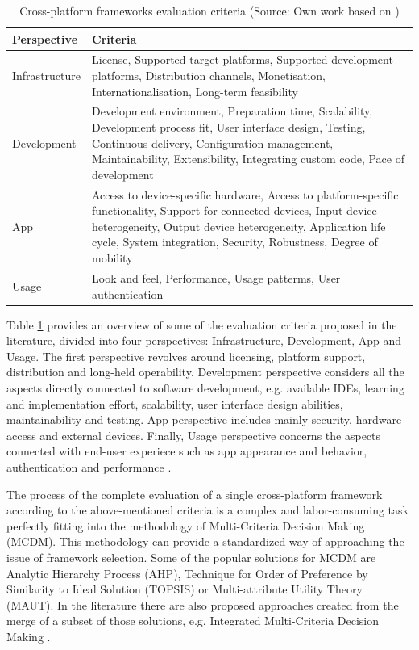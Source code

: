 \begin{table}[h]
	\centering
	\caption{Cross-platform frameworks evaluation criteria (Source: Own work based on \cite{rieger_eval_cp})}
	\label{tab:eval_criteria}
	\begin{tabular}{ |l|p{}| }
		\hline
		\textbf{Perspective}&\textbf{Criteria}\\
		\hline
		Infrastructure&License, Supported target platforms, Supported development platforms, Distribution channels, Monetisation, Internationalisation, Long-term feasibility\\
		\hline
		Development&Development environment, Preparation time, Scalability, Development process fit, User interface design, Testing, Continuous delivery, Configuration management, Maintainability, Extensibility, Integrating custom code, Pace of development\\
		\hline
		App&Access to device-specific hardware, Access to platform-specific functionality, Support for connected devices, Input device heterogeneity, Output device heterogeneity, Application life cycle, System integration, Security, Robustness, Degree of mobility \\
		\hline
		Usage&Look and feel, Performance, Usage patterms, User authentication\\
		\hline
	\end{tabular}
\end{table}

Table \ref{tab:eval_criteria} provides an overview of some of the evaluation criteria proposed in the literature, divided into four perspectives: Infrastructure, Development, App and Usage. The first perspective revolves around licensing, platform support, distribution and long-held operability. Development perspective considers all the aspects directly connected to software development, e.g. available IDEs, learning and implementation effort, scalability, user interface design abilities, maintainability and testing. App perspective includes mainly security, hardware access and external devices. Finally, Usage perspective concerns the aspects connected with end-user experiece such as app appearance and behavior, authentication and performance \cite{eval_rn_flutter,rieger_eval_cp}.

The process of the complete evaluation of a single cross-platform framework according to the above-mentioned criteria is a complex and labor-consuming task perfectly fitting into the methodology of Multi-Criteria Decision Making (MCDM). This methodology can provide a standardized way of approaching the issue of framework selection. Some of the popular solutions for MCDM are Analytic Hierarchy Process (AHP), Technique for Order of Preference by Similarity to Ideal Solution (TOPSIS) or Multi-attribute Utility Theory (MAUT). In the literature there are also proposed approaches created from the merge of a subset of those solutions, e.g. Integrated Multi-Criteria Decision Making \cite{lachgar_mcdm_cp}.
